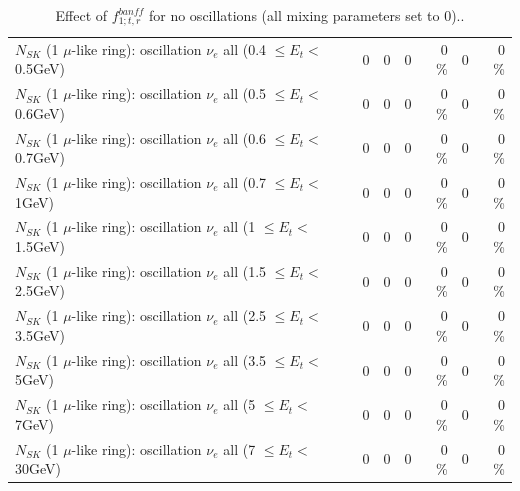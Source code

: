 \begin{table}
\begin{tabular}{| l | r | r | r  r | r  r |}
$N_{SK}$ (1 $\mu$-like ring): oscillation $\nu_{e}$ all (0.4 $\leq E_{t} <$ 0.5GeV) &               0 &               0 &               0 &        0 \%  &               0 &        0 \%  \\ 
$N_{SK}$ (1 $\mu$-like ring): oscillation $\nu_{e}$ all (0.5 $\leq E_{t} <$ 0.6GeV) &               0 &               0 &               0 &        0 \%  &               0 &        0 \%  \\ 
$N_{SK}$ (1 $\mu$-like ring): oscillation $\nu_{e}$ all (0.6 $\leq E_{t} <$ 0.7GeV) &               0 &               0 &               0 &        0 \%  &               0 &        0 \%  \\ 
$N_{SK}$ (1 $\mu$-like ring): oscillation $\nu_{e}$ all (0.7 $\leq E_{t} <$ 1GeV) &               0 &               0 &               0 &        0 \%  &               0 &        0 \%  \\ 
$N_{SK}$ (1 $\mu$-like ring): oscillation $\nu_{e}$ all (1 $\leq E_{t} <$ 1.5GeV) &               0 &               0 &               0 &        0 \%  &               0 &        0 \%  \\ 
$N_{SK}$ (1 $\mu$-like ring): oscillation $\nu_{e}$ all (1.5 $\leq E_{t} <$ 2.5GeV) &               0 &               0 &               0 &        0 \%  &               0 &        0 \%  \\ 
$N_{SK}$ (1 $\mu$-like ring): oscillation $\nu_{e}$ all (2.5 $\leq E_{t} <$ 3.5GeV) &               0 &               0 &               0 &        0 \%  &               0 &        0 \%  \\ 
$N_{SK}$ (1 $\mu$-like ring): oscillation $\nu_{e}$ all (3.5 $\leq E_{t} <$ 5GeV) &               0 &               0 &               0 &        0 \%  &               0 &        0 \%  \\ 
 $N_{SK}$ (1 $\mu$-like ring): oscillation $\nu_{e}$ all (5 $\leq E_{t} <$ 7GeV) &               0 &               0 &               0 &        0 \%  &               0 &        0 \%  \\ 
$N_{SK}$ (1 $\mu$-like ring): oscillation $\nu_{e}$ all (7 $\leq E_{t} <$ 30GeV) &               0 &               0 &               0 &        0 \%  &               0 &        0 \%  \\ 
\hline
\hline
\end{tabular}
\caption{ Effect of $f_{1; t, r}^{banff}$ for no oscillations (all mixing parameters set to 0).. }
\label{tab:num_banff_01_1RmuT_3f_osc_t13:0}
\end{table}
\clearpage
